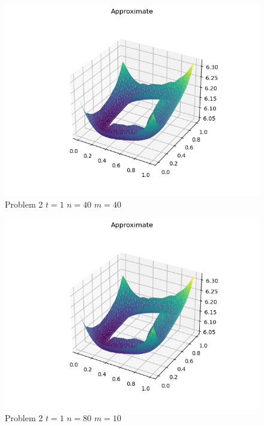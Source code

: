 \documentclass{report}
\begin{document}
\begin{figure}[h]
	\caption{Problem 2 $t = 1$ $n = 40$ $m = 40$}
	\includegraphics[width=\textwidth]{example.png}
\end{figure}
\begin{figure}[h]
	\caption{Problem 2 $t = 1$ $n = 80$ $m = 10$}
	\includegraphics[width=\textwidth]{example.png}
\end{figure}
\end{document}
